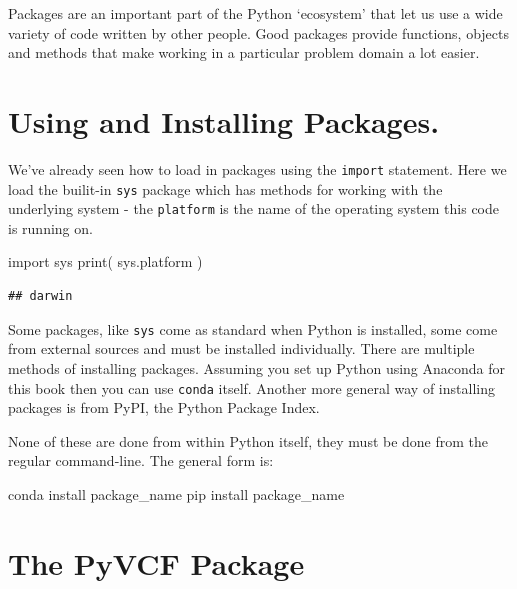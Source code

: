 \documentclass[]{book}
\newenvironment{Shaded}{\begin{snugshade}}{\end{snugshade}}
\newcommand{\BuiltInTok}[1]{#1}
\newcommand{\ExtensionTok}[1]{#1}
\newcommand{\ImportTok}[1]{#1}
\newcommand{\NormalTok}[1]{#1}
\theoremstyle{definition}
\theoremstyle{definition}
\theoremstyle{definition}
\theoremstyle{remark}
\begin{document}
Packages are an important part of the Python `ecosystem' that let us use
a wide variety of code written by other people. Good packages provide
functions, objects and methods that make working in a particular problem
domain a lot easier.

\hypertarget{using-and-installing-packages.}{%
\section{Using and Installing
Packages.}\label{using-and-installing-packages.}}

We've already seen how to load in packages using the \texttt{import}
statement. Here we load the builit-in \texttt{sys} package which has
methods for working with the underlying system - the \texttt{platform}
is the name of the operating system this code is running on.

\begin{Shaded}
\begin{Highlighting}[]
\ImportTok{import}\NormalTok{ sys}
\BuiltInTok{print}\NormalTok{( sys.platform )}
\end{Highlighting}
\end{Shaded}

\begin{verbatim}
## darwin
\end{verbatim}

Some packages, like \texttt{sys} come as standard when Python is
installed, some come from external sources and must be installed
individually. There are multiple methods of installing packages.
Assuming you set up Python using Anaconda for this book then you can use
\texttt{conda} itself. Another more general way of installing packages
is from PyPI, the Python Package Index.

None of these are done from within Python itself, they must be done from
the regular command-line. The general form is:

\begin{Shaded}
\begin{Highlighting}[]
\ExtensionTok{conda}\NormalTok{ install package_name}
\ExtensionTok{pip}\NormalTok{ install package_name}
\end{Highlighting}
\end{Shaded}

\hypertarget{the-pyvcf-package}{%
\section{The PyVCF Package}\label{the-pyvcf-package}}
\end{document}
